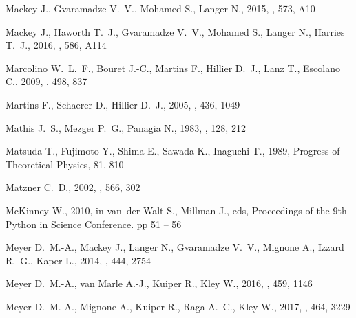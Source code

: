 \documentclass[useAMS, usenatbib, a4paper]{mnras}
\begin{document}
\begin{thebibliography}{}
{Mackey} J.,  {Gvaramadze} V.~V.,  {Mohamed} S.,   {Langer} N.,  2015, \aap,
  573, A10

{Mackey} J.,  {Haworth} T.~J.,  {Gvaramadze} V.~V.,  {Mohamed} S.,  {Langer}
  N.,   {Harries} T.~J.,  2016, \aap, 586, A114

{Marcolino} W.~L.~F.,  {Bouret} J.-C.,  {Martins} F.,  {Hillier} D.~J.,  {Lanz}
  T.,   {Escolano} C.,  2009, \aap, 498, 837

{Martins} F.,  {Schaerer} D.,   {Hillier} D.~J.,  2005, \aap, 436, 1049

{Mathis} J.~S.,  {Mezger} P.~G.,   {Panagia} N.,  1983, \aap, 128, 212

{Matsuda} T.,  {Fujimoto} Y.,  {Shima} E.,  {Sawada} K.,   {Inaguchi} T.,
  1989, Progress of Theoretical Physics, 81, 810

{Matzner} C.~D.,  2002, \apj, 566, 302

McKinney W.,  2010, in van~der Walt S.,  Millman J.,  eds, Proceedings of the
  9th Python in Science Conference. pp 51 -- 56

{Meyer} D.~M.-A.,  {Mackey} J.,  {Langer} N.,  {Gvaramadze} V.~V.,  {Mignone}
  A.,  {Izzard} R.~G.,   {Kaper} L.,  2014, \mnras, 444, 2754

{Meyer} D.~M.-A.,  {van Marle} A.-J.,  {Kuiper} R.,   {Kley} W.,  2016, \mnras,
  459, 1146

{Meyer} D.~M.-A.,  {Mignone} A.,  {Kuiper} R.,  {Raga} A.~C.,   {Kley} W.,
  2017, \mnras, 464, 3229


\end{thebibliography}
\end{document}
